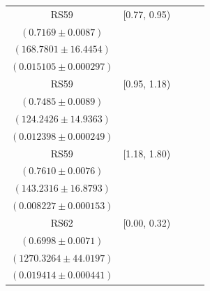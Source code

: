 {\begin{longtable}{|c|c|c|c|c|}
RS59 & [0.77, 0.95) & \begin{tabular}{@{}c@{}}$0.7184 \pm 0.0080$ \\ $(0.7169 \pm 0.0087)$\end{tabular} & \begin{tabular}{@{}c@{}}$168.4233 \pm 16.4106$ \\ $(168.7801 \pm 16.4454)$\end{tabular} & \begin{tabular}{@{}c@{}}$0.013390 \pm 0.000525$ \\ $(0.015105 \pm 0.000297)$\end{tabular} \\ \hline
RS59 & [0.95, 1.18) & \begin{tabular}{@{}c@{}}$0.7080 \pm 0.0090$ \\ $(0.7485 \pm 0.0089)$\end{tabular} & \begin{tabular}{@{}c@{}}$131.3576 \pm 15.7916$ \\ $(124.2426 \pm 14.9363)$\end{tabular} & \begin{tabular}{@{}c@{}}$0.011870 \pm 0.000457$ \\ $(0.012398 \pm 0.000249)$\end{tabular} \\ \hline
RS59 & [1.18, 1.80) & \begin{tabular}{@{}c@{}}$0.6911 \pm 0.0106$ \\ $(0.7610 \pm 0.0076)$\end{tabular} & \begin{tabular}{@{}c@{}}$157.7256 \pm 18.5874$ \\ $(143.2316 \pm 16.8793)$\end{tabular} & \begin{tabular}{@{}c@{}}$0.007876 \pm 0.000279$ \\ $(0.008227 \pm 0.000153)$\end{tabular} \\ \hline
\hline
RS62 & [0.00, 0.32) & \begin{tabular}{@{}c@{}}$0.7185 \pm 0.0082$ \\ $(0.6998 \pm 0.0071)$\end{tabular} & \begin{tabular}{@{}c@{}}$1238.6805 \pm 42.8974$ \\ $(1270.3264 \pm 44.0197)$\end{tabular} & \begin{tabular}{@{}c@{}}$0.017346 \pm 0.000778$ \\ $(0.019414 \pm 0.000441)$\end{tabular} \\ \hline

\end{longtable}}
